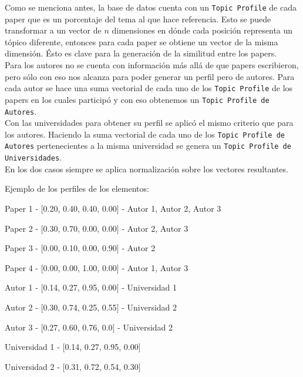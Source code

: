 Como se menciona antes, la base de datos cuenta con un \texttt{Topic Profile} de cada paper que es un porcentaje del tema al que hace referencia. Esto se puede transformar a un vector de $n$ dimensiones en dónde cada posición representa un tópico diferente, entonces para cada paper se obtiene un vector de la misma dimensión. Ésto es clave para la generación de la similitud entre los papers.\\
Para los autores no se cuenta con información más allá de que papers escribieron, pero sólo con eso nos alcanza para poder generar un perfil pero de autores. Para cada autor se hace una suma vectorial de cada uno de los \texttt{Topic Profile} de los papers en los cuales participó y con eso obtenemos un \texttt{Topic Profile de Autores}.\\
Con las universidades para obtener su perfil se aplicó el mismo criterio que para los autores. Haciendo la suma vectorial de cada uno de los \texttt{Topic Profile de Autores} pertenecientes a la misma universidad se genera un \texttt{Topic Profile de Universidades}.\\
En los dos casos siempre se aplica normalización sobre los vectores resultantes.

Ejemplo de los perfiles de los elementos:

\begin{description}
 \item[Paper - Topic Profile - Autores]
 \item Paper 1 - $[$0.20, 0.40, 0.40, 0.00$]$ - Autor 1, Autor 2, Autor 3
 \item Paper 2 - $[$0.30, 0.70, 0.00, 0.00$]$ - Autor 2, Autor 3
 \item Paper 3 - $[$0.00, 0.10, 0.00, 0.90$]$ - Autor 2
 \item Paper 4 - $[$0.00, 0.00, 1.00, 0.00$]$ - Autor 1, Autor 3
\end{description}

\begin{description}
 \item[Autor - Topic Profile - Universidad]
 \item Autor 1 - $[$0.14, 0.27, 0.95, 0.00$]$ - Universidad 1
 \item Autor 2 - $[$0.30, 0.74, 0.25, 0.55$]$ - Universidad 2
 \item Autor 3 - $[$0.27, 0.60, 0.76, 0.0$]$ - Universidad 2
\end{description}

\begin{description}
 \item[Universidad - Topic Profile]
 \item Universidad 1 - $[$0.14, 0.27, 0.95, 0.00$]$
 \item Universidad 2 - $[$0.31, 0.72, 0.54, 0.30$]$
\end{description}
